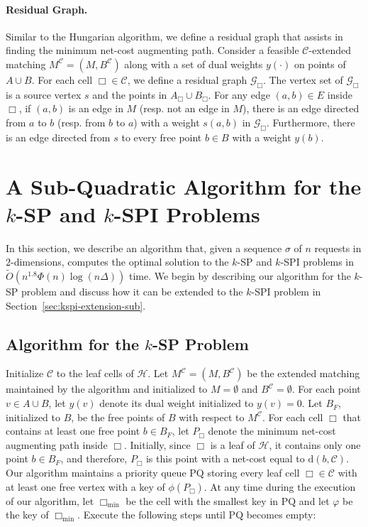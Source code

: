 \documentclass[11pt,onecolumn]{article}
\def\mcC{{\mathcal{C}}}
\def\mcG{{\mathcal{G}}}
\def\mcH{{\mathcal{H}}}
\newcommand{\cell}{\Box}
\newcommand{\distance}[2]{\mathrm{d}(#1, #2)}
\newcommand{\requests}{\sigma}
\newcommand{\pq}{\mathrm{PQ}}
\newcommand{\ymax}{\varphi}
\newcommand\myparagraph[1]{\paragraph{#1}}
\begin{document}
\myparagraph{Residual Graph.}
Similar to the Hungarian algorithm, we define a residual graph that assists in finding the minimum net-cost augmenting path. Consider a feasible $\mcC$-extended matching $M^{\mcC}=(M,B^{\mcC})$ along with a set of dual weights $y(\cdot)$ on points of $A\cup B$. For each cell $\cell \in \mcC$, we define a residual graph $\mcG_{\cell}$. The vertex set of $\mcG_{\cell}$ is a source vertex $s$ and the points in $A_{\cell}\cup B_{\cell}$. For any edge $(a,b)\in E$ inside $\cell$, if $(a,b)$ is an edge in $M$ (resp. not an edge in $M$), there is an edge directed from $a$ to $b$ (resp. from $b$ to $a$) with a weight $s(a,b)$ in $\mcG_\cell$. Furthermore, there is an edge directed from $s$ to every free point $b\in B$ with a weight $y(b)$.

\section{A Sub-Quadratic Algorithm for the \texorpdfstring{$k$}{}-SP and \texorpdfstring{$k$}{}-SPI Problems}\label{sec:k-seq}
In this section, we describe an algorithm that, given a sequence $\requests$ of $n$ requests in $2$-dimensions, computes the optimal solution to the $k$-SP and $k$-SPI problems in $\tilde{O}(n^{1.8}\Phi(n)\log(n\Delta))$ time. We begin by describing our algorithm for the $k$-SP problem and discuss how it can be extended to the $k$-SPI problem in Section~\ref{sec:kspi-extension-sub}.


\subsection{Algorithm for the \texorpdfstring{$k$}{}-SP Problem}
Initialize $\mcC$ to the leaf cells of $\mcH$. Let $M^{\mcC}=(M, B^{\mcC})$ be the extended matching maintained by the algorithm and initialized to $M=\emptyset$ and $B^{\mcC}=\emptyset$. For each point $v \in A\cup B$, let $y(v)$ denote its dual weight initialized to $y(v)=0$. Let $B_F$, initialized to $B$, be the free points of $B$ with respect to $M^{\mcC}$. For each cell $\cell$ that contains at least one free point $b \in B_F$, let $P_\cell$ denote the minimum net-cost augmenting path inside $\cell$. Initially, since $\cell$ is a leaf of $\mcH$, it contains only one point $b \in B_F$, and therefore, $P_{\cell}$ is this point with a net-cost equal to $\distance{b}{\mcC}$. Our algorithm maintains a priority queue $\pq$ storing every leaf cell $\cell\in\mcC$ with at least one free vertex with a key of $\phi(P_\cell)$. 
At any time during the execution of our algorithm, let $\cell_{\min}$ be the cell with the smallest key in $\pq$ and let $\ymax$ be the key of $\cell_{\min}$.
Execute the following steps until $\pq$ becomes empty:
\end{document}
